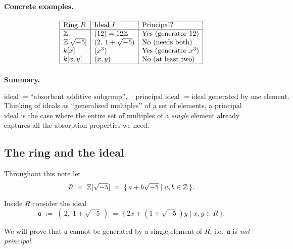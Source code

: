\documentclass[12pt]{article}
\theoremstyle{definition} %
\theoremstyle{plain} %
\begin{document}
\paragraph{Concrete examples.}

\[
\begin{array}{|l|l|l|}\hline
   \text{Ring }R              & \text{Ideal }I                              & \text{Principal?} \\ \hline
   \Bbb Z                     & (12)=12\Bbb Z                               & \text{Yes (generator }12) \\ 
   \Bbb Z[\sqrt{-5}]         & (2,\,1+\sqrt{-5})                            & \text{No (needs both)} \\ 
   k[x]                       & (x^3)                                       & \text{Yes (generator }x^3) \\
   k[x,y]                     & (x,y)                                       & \text{No (at least two)} \\ \hline
\end{array}
\]

\paragraph{Summary.}
\[
  \text{ideal } = \text{``absorbent additive subgroup''},\quad
  \text{principal ideal } = \text{ideal generated by one element.}
\]
Thinking of ideals as “generalised multiples’’ of a set of elements,
a principal ideal is the case where the entire set of multiples of a
\emph{single} element already captures all the absorption properties we need.

\subsection*{The ring and the ideal}

Throughout this note let
\[
    R \;=\; \Bbb Z[\sqrt{-5}]
    \;=\;
    \{\,a+b\sqrt{-5}\mid a,b\in\Bbb Z\,\}.
\]

Inside \(R\) consider the ideal
\[
    \mathfrak a \;:=\; (\,2,\;1+\sqrt{-5}\,)
    \;=\;
    \bigl\{\,2x + (1+\sqrt{-5})y \mid x,y\in R\,\bigr\}.
\]

We will prove that \(\mathfrak a\) cannot be generated by a single element of \(R\),
i.e.\ \(\mathfrak a\) is \emph{not principal}.
\end{document}
